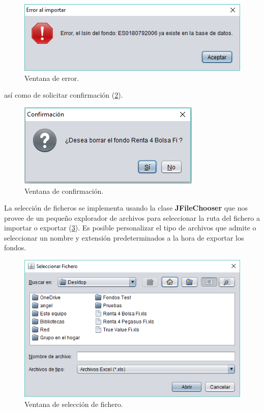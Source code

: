 \documentclass[12pt, a4paper]{book}
\begin{document}
	\begin{figure}[htbp]
	\centering
	\includegraphics{figuras/error.PNG}
	\caption{Ventana de error.}
	\label{fig:error}
	\end {figure}
\newpage

así como de solicitar confirmación (\ref{fig:confirmacion}).\\

	\begin{figure}[htbp]
	\centering
	\includegraphics{figuras/confirmacion.PNG}
	\caption{Ventana de confirmación.}
	\label{fig:confirmacion}
	\end {figure}

\vspace{1cm}
La selección de ficheros se implementa usando la clase \textbf{JFileChooser} que nos provee de un pequeño explorador de archivos para seleccionar la ruta del fichero a importar o exportar (\ref{fig:fichero}). Es posible personalizar el tipo de archivos que admite o seleccionar un nombre y extensión predeterminados a la hora de exportar los fondos.\\

	\begin{figure}[htbp]
	\centering
	\includegraphics[width=12cm]{figuras/fichero.PNG}
	\caption{Ventana de selección de fichero.}
	\label{fig:fichero}
	\end {figure}
\end{document}
